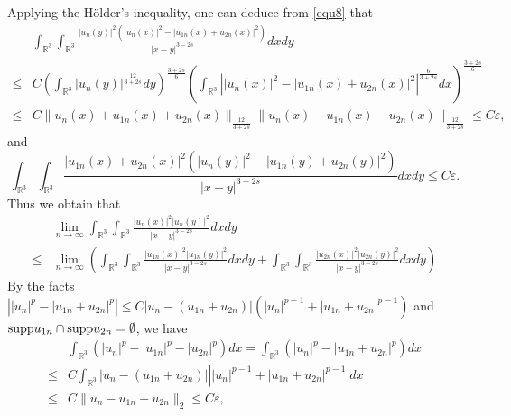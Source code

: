 \documentclass[reqno, 11pt]{amsart} %
\numberwithin{equation}{section}
\begin{document}
	Applying the H\"{o}lder's inequality, one can deduce from \eqref{equ8} that
	\begin{equation*}
		\begin{split}
			&	\int_{\mathbb{R}^{3}}\int_{\mathbb{R}^{3}} \frac{|u_{n}(y)|^{2}\left(|u_{n}(x)|^{2}-|u_{1n}(x)+u_{2n}(x)|^{2} \right) }{|x-y|^{3-2s}}dxdy\\
			\leq&C \left(	\int_{\mathbb{R}^{3}}|u_{n}(y)|^{\frac{12}{3+2s}} dy\right)^{\frac{3+2s}{6}}\left( \int_{\mathbb{R}^{3}}\left| |u_{n}(x)|^{2}-|u_{1n}(x)+u_{2n}(x)|^{2}\right|^{\frac{6}{3+2s}}dx\right)^{\frac{3+2s}{6}}\\
			\leq &C\| u_{n}(x)+u_{1n}(x)+u_{2n}(x)\|_{\frac{12}{3+2s}}\| u_{n}(x)-u_{1n}(x)-u_{2n}(x)\|_{\frac{12}{3+2s}}\leq C\varepsilon,
		\end{split}
	\end{equation*}
	and
	\begin{equation*}
		\int_{\mathbb{R}^{3}}\int_{\mathbb{R}^{3}} \frac{|u_{1n}(x)+u_{2n}(x)|^{2}\left(|u_{n}(y)|^{2}-|u_{1n}(y)+u_{2n}(y)|^{2} \right) }{|x-y|^{3-2s}}dxdy\leq C\varepsilon.
	\end{equation*}
	Thus we obtain that
	\begin{equation}\label{equ2-10}
		\begin{split}
			&\lim_{n\rightarrow\infty}\int_{\mathbb{R}^{3}}\int_{\mathbb{R}^{3}}\frac{|u_{n}(x)|^{2}|u_{n}(y)|^{2}}{|x-y|^{3-2s}}dxdy\\
			\leq&\lim_{n\rightarrow\infty}\left( \int_{\mathbb{R}^{3}}\int_{\mathbb{R}^{3}}\frac{|u_{1n}(x)|^{2}|u_{1n}(y)|^{2}}{|x-y|^{3-2s}}dxdy+\int_{\mathbb{R}^{3}}\int_{\mathbb{R}^{3}}\frac{|u_{2n}(x)|^{2}|u_{2n}(y)|^{2}}{|x-y|^{3-2s}}dxdy\right) 
		\end{split}
	\end{equation}
	By the facts $\left|\left| u_{n}\right| ^{p} -\left|u_{1n}+u_{2n} \right| ^{p}\right| \leq C\left| u_{n}-(u_{1n}+u_{2n})\right| \left(\left| u_{n}\right| ^{p-1}+\left|u_{1n}+u_{2n} \right| ^{p-1} \right) $ and ${\rm supp}u_{1n}\cap{\rm supp}u_{2n}=\emptyset$, we have
	\begin{equation*}
		\begin{split}
			&\int_{\mathbb{R}^{3}}\left(\left| u_{n}\right| ^{p} -\left| u_{1n}\right| ^{p} -\left| u_{2n}\right| ^{p}  \right) 	dx=\int_{\mathbb{R}^{3}}\left( \left| u_{n}\right| ^{p}-\left| u_{1n}+u_{2n}\right| ^{p}\right) dx\\
			\leq &C\int_{\mathbb{R}^{3}}\left| u_{n}-(u_{1n}+u_{2n})\right| \left| \left| u_{n}\right| ^{p-1}+\left|u_{1n}+u_{2n} \right| ^{p-1} \right| dx\\
			\leq&C\| u_{n}-u_{1n}-u_{2n}\|_{2}\leq C\varepsilon,
		\end{split}
	\end{equation*}
\end{document}

